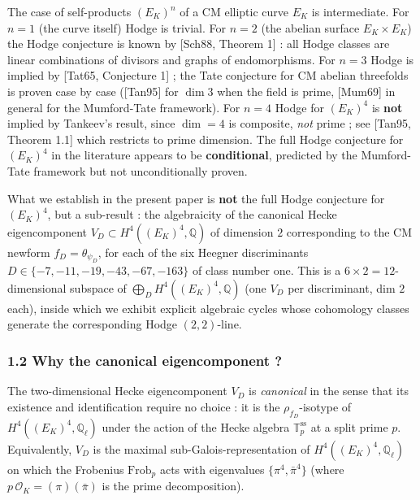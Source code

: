 \documentclass[
  11pt,
  a4paper,
]{amsart}
\begin{document}
The case of self-products \((E_K)^n\) of a CM elliptic curve \(E_K\) is intermediate. For \(n = 1\) (the curve itself) Hodge is trivial. For \(n = 2\) (the abelian surface \(E_K \times E_K\)) the Hodge conjecture is known by {[}Sch88, Theorem 1{]} : all Hodge classes are linear combinations of divisors and graphs of endomorphisms. For \(n = 3\) Hodge is implied by {[}Tat65, Conjecture 1{]} ; the Tate conjecture for CM abelian threefolds is proven case by case ({[}Tan95{]} for \(\dim 3\) when the field is prime, {[}Mum69{]} in general for the Mumford-Tate framework). For \(n = 4\) Hodge for \((E_K)^4\) is \textbf{not} implied by Tankeev's result, since \(\dim = 4\) is composite, \emph{not} prime ; see {[}Tan95, Theorem 1.1{]} which restricts to prime dimension. The full Hodge conjecture for \((E_K)^4\) in the literature appears to be \textbf{conditional}, predicted by the Mumford-Tate framework but not unconditionally proven.

What we establish in the present paper is \textbf{not} the full Hodge conjecture for \((E_K)^4\), but a sub-result : the algebraicity of the canonical Hecke eigencomponent \(V_D \subset H^4((E_K)^4, \mathbb{Q})\) of dimension \(2\) corresponding to the CM newform \(f_D = \theta_{\psi_D}\), for each of the six Heegner discriminants \(D \in \{-7,-11,-19,-43,-67,-163\}\) of class number one. This is a \(6 \times 2 = 12\)-dimensional subspace of \(\bigoplus_{D} H^4((E_K)^4, \mathbb{Q})\) (one \(V_D\) per discriminant, dim \(2\) each), inside which we exhibit explicit algebraic cycles whose cohomology classes generate the corresponding Hodge \((2,2)\)-line.

\hypertarget{why-the-canonical-eigencomponent}{%
\subsubsection{1.2 Why the canonical eigencomponent ?}\label{why-the-canonical-eigencomponent}}

The two-dimensional Hecke eigencomponent \(V_D\) is \emph{canonical} in the sense that its existence and identification require no choice : it is the \(\rho_{f_D}\)-isotype of \(H^4((E_K)^4, \mathbb{Q}_\ell)\) under the action of the Hecke algebra \(\mathbb{T}_p^{\mathrm{ss}}\) at a split prime \(p\). Equivalently, \(V_D\) is the maximal sub-Galois-representation of \(H^4((E_K)^4, \mathbb{Q}_\ell)\) on which the Frobenius \(\mathrm{Frob}_p\) acts with eigenvalues \(\{\pi^4, \bar\pi^4\}\) (where \(p\,\mathcal{O}_K = (\pi)(\bar\pi)\) is the prime decomposition).
\end{document}
